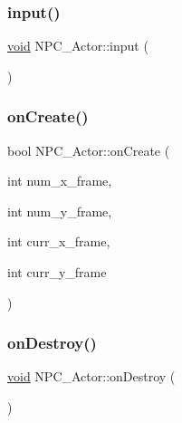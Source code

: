 \mbox{\label{classNPC__Actor_a69631753bbb4fc94c3d9e1cd7e550f07}} 
\subsubsection{\texorpdfstring{input()}{input()}}
{\footnotesize\ttfamily \hyperlink{imgui__impl__opengl3__loader_8h_ac668e7cffd9e2e9cfee428b9b2f34fa7}{void} N\+P\+C\+\_\+\+Actor\+::input (\begin{DoxyParamCaption}{ }\end{DoxyParamCaption})}

\mbox{\label{classNPC__Actor_a290c88cbf6fb977dd5084d0ee75ba34b}} 
\subsubsection{\texorpdfstring{on\+Create()}{onCreate()}}
{\footnotesize\ttfamily bool N\+P\+C\+\_\+\+Actor\+::on\+Create (\begin{DoxyParamCaption}\item[{int}]{num\+\_\+x\+\_\+frame,  }\item[{int}]{num\+\_\+y\+\_\+frame,  }\item[{int}]{curr\+\_\+x\+\_\+frame,  }\item[{int}]{curr\+\_\+y\+\_\+frame }\end{DoxyParamCaption})}

\mbox{\label{classNPC__Actor_ab274d0517bd0cd710efc7df31cd7450b}} 
\subsubsection{\texorpdfstring{on\+Destroy()}{onDestroy()}}
{\footnotesize\ttfamily \hyperlink{imgui__impl__opengl3__loader_8h_ac668e7cffd9e2e9cfee428b9b2f34fa7}{void} N\+P\+C\+\_\+\+Actor\+::on\+Destroy (\begin{DoxyParamCaption}{ }\end{DoxyParamCaption})\hspace{0.3cm}{\ttfamily [virtual]}}



